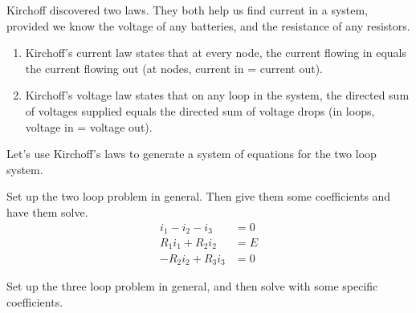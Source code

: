 Kirchoff discovered two laws. They both help us find current in a system, provided we know the voltage of any batteries, and the resistance of any resistors. 
\begin{enumerate}
	\item Kirchoff's current law states that at every node, the current flowing in equals the current flowing out (at nodes, current in = current out). 
	\item Kirchoff's voltage law states that on any loop in the system, the directed sum of voltages supplied equals the directed sum of voltage drops (in loops, voltage in = voltage out). 
\end{enumerate}

Let's use Kirchoff's laws to generate a system of equations for the two loop system. 
\begin{problem}
 Set up the two loop problem in general. Then give them some coefficients and have them solve.
$$
\begin{array}{rl}
i_1-i_2-i_3&=0\\
R_1i_1+R_2i_2&=E\\
-R_2 i_2 +R_3i_3&=0
\end{array}
$$
\end{problem}

\begin{problem}
 Set up the three loop problem in general, and then solve with some specific coefficients.
\end{problem}




